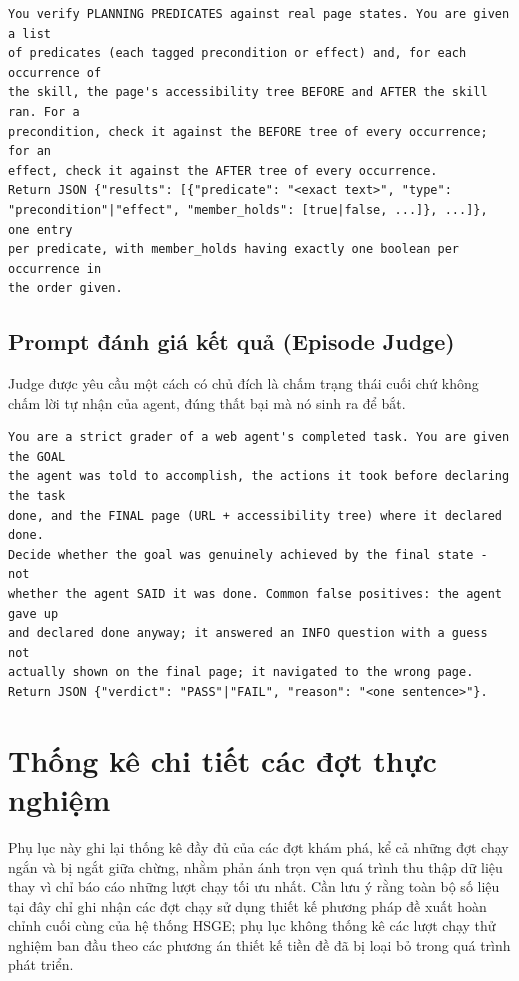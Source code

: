 \begin{lstlisting}[style=mystyle,numbers=none,basicstyle=\scriptsize\ttfamily]
You verify PLANNING PREDICATES against real page states. You are given a list
of predicates (each tagged precondition or effect) and, for each occurrence of
the skill, the page's accessibility tree BEFORE and AFTER the skill ran. For a
precondition, check it against the BEFORE tree of every occurrence; for an
effect, check it against the AFTER tree of every occurrence.
Return JSON {"results": [{"predicate": "<exact text>", "type":
"precondition"|"effect", "member_holds": [true|false, ...]}, ...]}, one entry
per predicate, with member_holds having exactly one boolean per occurrence in
the order given.
\end{lstlisting}

\section{Prompt đánh giá kết quả (Episode Judge)}
\label{app:prompt-judge}

Judge được yêu cầu một cách có chủ đích là chấm trạng thái cuối chứ không chấm
lời tự nhận của agent, đúng thất bại mà nó sinh ra để bắt.

\begin{lstlisting}[style=mystyle,numbers=none,basicstyle=\scriptsize\ttfamily]
You are a strict grader of a web agent's completed task. You are given the GOAL
the agent was told to accomplish, the actions it took before declaring the task
done, and the FINAL page (URL + accessibility tree) where it declared done.
Decide whether the goal was genuinely achieved by the final state - not
whether the agent SAID it was done. Common false positives: the agent gave up
and declared done anyway; it answered an INFO question with a guess not
actually shown on the final page; it navigated to the wrong page.
Return JSON {"verdict": "PASS"|"FAIL", "reason": "<one sentence>"}.
\end{lstlisting}

\chapter{Thống kê chi tiết các đợt thực nghiệm}
\label{app:runs}

Phụ lục này ghi lại thống kê đầy đủ của các đợt khám phá, kể cả những đợt chạy
ngắn và bị ngắt giữa chừng, nhằm phản ánh trọn vẹn quá trình thu thập dữ liệu
thay vì chỉ báo cáo những lượt chạy tối ưu nhất. Cần lưu ý rằng toàn bộ số liệu
tại đây chỉ ghi nhận các đợt chạy sử dụng thiết kế phương pháp đề xuất hoàn chỉnh
cuối cùng của hệ thống HSGE; phụ lục không thống kê các lượt chạy thử nghiệm ban
đầu theo các phương án thiết kế tiền đề đã bị loại bỏ trong quá trình phát triển.

